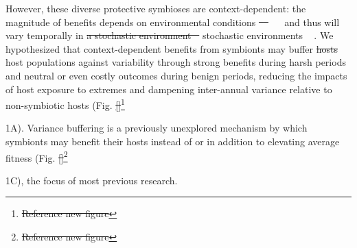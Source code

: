 \documentclass[lineno, sn-basic]{sn-jnl}%
\providecommand{\DIFadd}[1]{{\protect\color{blue}#1}} %
\providecommand{\DIFdel}[1]{{\protect\color{red}\protect\scriptsize\sout{#1}}}
\providecommand{\DIFadd}[1]{{\protect\color{blue}\uwave{#1}}} %
\providecommand{\DIFdel}[1]{{\protect\color{red}\sout{#1}}}                      %
\providecommand{\DIFaddbegin}{} %
\providecommand{\DIFaddend}{} %
\providecommand{\DIFdelbegin}{} %
\providecommand{\DIFdelend}{} %
\newcommand{\DIFscaledelfig}{0.5}
\newlength{\DIFdelgraphicswidth} %
\newlength{\DIFdelgraphicsheight} %
\newcommand{\DIFaddincludegraphics}[2][]{{\color{blue}\fbox{\DIFOincludegraphics[#1]{#2}}}} %
\newcommand{\DIFdelincludegraphics}[2][]{%
\sbox{\DIFdelgraphicsbox}{\DIFOincludegraphics[#1]{#2}}%
\settoboxwidth{\DIFdelgraphicswidth}{\DIFdelgraphicsbox} %
\settoboxtotalheight{\DIFdelgraphicsheight}{\DIFdelgraphicsbox} %
\scalebox{\DIFscaledelfig}{%
\parbox[b]{\DIFdelgraphicswidth}{\usebox{\DIFdelgraphicsbox}\\[-\baselineskip] \rule{\DIFdelgraphicswidth}{0em}}\llap{\resizebox{\DIFdelgraphicswidth}{\DIFdelgraphicsheight}{%
\setlength{\unitlength}{\DIFdelgraphicswidth}%
\begin{picture}(1,1)%
\thicklines\linethickness{2pt} %
{\color[rgb]{1,0,0}\put(0,0){\framebox(1,1){}}}%
{\color[rgb]{1,0,0}\put(0,0){\line( 1,1){1}}}%
{\color[rgb]{1,0,0}\put(0,1){\line(1,-1){1}}}%
\end{picture}%
}\hspace*{3pt}}} %
} %
\DeclareRobustCommand{\DIFaddbegin}{\DIFOaddbegin \let\includegraphics\DIFaddincludegraphics} %
\DeclareRobustCommand{\DIFaddend}{\DIFOaddend \let\includegraphics\DIFOincludegraphics} %
\DeclareRobustCommand{\DIFdelbegin}{\DIFOdelbegin \let\includegraphics\DIFdelincludegraphics} %
\DeclareRobustCommand{\DIFdelend}{\DIFOaddend \let\includegraphics\DIFOincludegraphics} %
\begin{document}
However, these diverse protective symbioses are context-dependent: the magnitude of benefits depends on environmental conditions \DIFdelbegin \DIFdel{\mbox{%
\cite{chamberlain2014context,catford2022addressing} }\hspace{0pt}%
}\DIFdelend \DIFaddbegin \DIFadd{\mbox{%
\citep{chamberlain2014context,catford2022addressing} }\hspace{0pt}%
}\DIFaddend and thus will vary temporally in \DIFdelbegin \DIFdel{a stochastic environment \mbox{%
\cite{jordano1994spatial}}\hspace{0pt}%
}\DIFdelend \DIFaddbegin \DIFadd{stochastic environments \mbox{%
\citep{jordano1994spatial}}\hspace{0pt}%
}\DIFaddend . 
We hypothesized that context-dependent benefits from symbionts may buffer \DIFdelbegin \DIFdel{hosts }\DIFdelend \DIFaddbegin \DIFadd{host populations }\DIFaddend against variability through strong benefits during harsh periods and neutral or even costly outcomes during benign periods, reducing the impacts of host exposure to extremes and dampening inter-annual variance relative to non-symbiotic hosts (Fig. \DIFdelbegin \DIFdel{\ref{}}\footnote{\DIFdel{Reference new figure}}%
\addtocounter{footnote}{-1}%
\DIFdelend \DIFaddbegin \DIFadd{1A}\DIFaddend ).
Variance buffering is a previously unexplored mechanism by which symbionts may benefit their hosts instead of or in addition to elevating average fitness (Fig. \DIFdelbegin \DIFdel{\ref{}}\footnote{\DIFdel{Reference new figure}}%
\addtocounter{footnote}{-1}%
\DIFdelend \DIFaddbegin \DIFadd{1C}\DIFaddend ), the focus of most previous research. 
\end{document}
